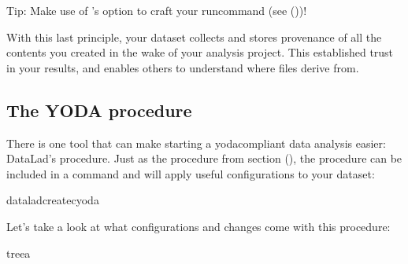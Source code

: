 \sphinxAtStartPar
Tip: Make use of ’s  option to craft your run\sphinxhyphen{}command (see {\hyperref[\detokenize{basics/101-110-run2:dryrun}]{}} ())!

\sphinxAtStartPar
With this last principle, your dataset collects and stores provenance
of all the contents you created in the wake of your analysis project.
This established trust in your results, and enables others to understand
where files derive from.


\subsection{The YODA procedure}
\label{\detokenize{basics/101-127-yoda:the-yoda-procedure}}\label{\detokenize{basics/101-127-yoda:yodaproc}}
\sphinxAtStartPar
There is one tool that can make starting a yoda\sphinxhyphen{}compliant data analysis
easier: DataLad’s  procedure. Just as the  procedure
from section {\hyperref[\detokenize{basics/101-101-create:createds}]{}} (), the  procedure can be included in a
 command and will apply useful configurations
to your dataset:

\begin{sphinxVerbatim}[commandchars=\\\{\}]
dataladcreate\PYGZhy{}cyoda

\end{sphinxVerbatim}

\sphinxAtStartPar
Let’s take a look at what configurations and changes come with this procedure:

\begin{sphinxVerbatim}[commandchars=\\\{\}]
tree\PYGZhy{}a

\end{sphinxVerbatim}

